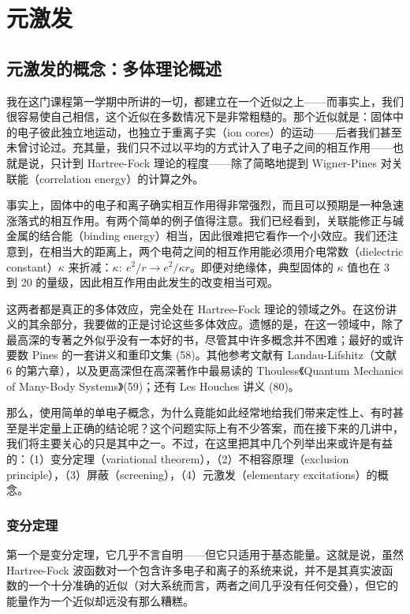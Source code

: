 
\chapter{元激发}

\section{元激发的概念：多体理论概述}

我在这门课程第一学期中所讲的一切，都建立在一个近似之上——而事实上，我们很容易使自己相信，这个近似在多数情况下是非常粗糙的。那个近似就是：固体中的电子彼此独立地运动，也独立于重离子实（ion cores）的运动——后者我们甚至未曾讨论过。充其量，我们只不过以平均的方式计入了电子之间的相互作用——也就是说，只计到 Hartree-Fock 理论的程度——除了简略地提到 Wigner-Pines 对关联能（correlation energy）的计算之外。

事实上，固体中的电子和离子确实相互作用得非常强烈，而且可以预期是一种急速涨落式的相互作用。有两个简单的例子值得注意。我们已经看到，关联能修正与碱金属的结合能（binding energy）相当，因此很难把它看作一个小效应。我们还注意到，在相当大的距离上，两个电荷之间的相互作用能必须用介电常数（dielectric constant）$\kappa$ 来折减：$\kappa:\ e^{2}/r \to e^{2}/\kappa r$。即便对绝缘体，典型固体的 $\kappa$ 值也在 3 到 20 的量级，因此相互作用由此发生的改变相当可观。

这两者都是真正的多体效应，完全处在 Hartree-Fock 理论的领域之外。在这份讲义的其余部分，我要做的正是讨论这些多体效应。遗憾的是，在这一领域中，除了最高深的专著之外似乎没有一本好的书，尽管其中许多概念并不困难；最好的或许要数 Pines 的一套讲义和重印文集 (58)。其他参考文献有 Landau-Lifshitz（文献 6 的第六章），以及更高深但在高深著作中最易读的 Thouless《Quantum Mechanics of Many-Body Systems》(59)；还有 Les Houches 讲义 (80)。

那么，使用简单的单电子概念，为什么竟能如此经常地给我们带来定性上、有时甚至是半定量上正确的结论呢？这个问题实际上有不少答案，而在接下来的几讲中，我们将主要关心的只是其中之一。不过，在这里把其中几个列举出来或许是有益的：（1）变分定理（variational theorem），（2）不相容原理（exclusion principle），（3）屏蔽（screening），（4）元激发（elementary excitations）的概念。

\subsection{变分定理}

第一个是变分定理，它几乎不言自明——但它只适用于基态能量。这就是说，虽然 Hartree-Fock 波函数对一个包含许多电子和离子的系统来说，并不是其真实波函数的一个十分准确的近似（对大系统而言，两者之间几乎没有任何交叠），但它的能量作为一个近似却远没有那么糟糕。

